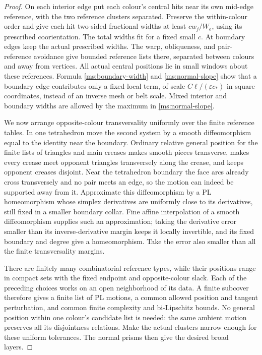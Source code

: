 \begin{proof}
On each interior edge put each colour's central hits near its own
mid-edge reference, with the two reference clusters separated.
Preserve the within-colour order and give each hit two-sided
fractional widths at least $c w_j/W_e$, using its prescribed
coorientation.  The total widths fit for a fixed small $c$.
At boundary edges keep the actual prescribed widths.  The warp,
obliqueness, and pair-reference avoidance give bounded reference
lists there, separated between colours and away from vertices.
All actual central positions lie in small windows about these
references.  Formula \eqref{ms:boundary-width} and
\eqref{ms:normal-slope} show that a boundary edge contributes only a
fixed local term, of scale $C\ell/(\varepsilon c_*)$ in square
coordinates, instead of an inverse mesh or belt scale.  Mixed
interior and boundary widths are allowed by the maximum in
\eqref{ms:normal-slope}.

We now arrange opposite-colour transversality uniformly over the
finite reference tables.  In one tetrahedron move the second
system by a smooth diffeomorphism equal to the identity near the
boundary.  Ordinary relative general position for the finite lists
of triangles and main creases makes smooth pieces transverse,
makes every crease meet opponent triangles transversely along the
crease, and keeps opponent creases disjoint.  Near the tetrahedron
boundary the face arcs already cross transversely and no pair meets
an edge, so the motion can indeed be supported away from it.
Approximate this diffeomorphism by a PL homeomorphism whose
simplex derivatives are uniformly close to its derivatives, still
fixed in a smaller boundary collar.  Fine affine interpolation of
a smooth diffeomorphism supplies such an approximation; taking the
derivative error smaller than its inverse-derivative margin keeps
it locally invertible, and its fixed boundary and degree give a
homeomorphism.  Take the error also smaller than all the finite
transversality margins.

There are finitely many combinatorial reference types, while their
positions range in compact sets with the fixed endpoint and
opposite-colour slack.  Each of the preceding choices works on an
open neighborhood of its data.  A finite subcover therefore gives
a finite list of PL motions, a common allowed position and tangent
perturbation, and common finite complexity and bi-Lipschitz bounds.
No general position within one colour's candidate list is needed:
the same ambient motion preserves all its disjointness relations.
Make the actual clusters narrow enough for these uniform
tolerances.  The normal prisms then give the desired broad layers.


\end{proof}
